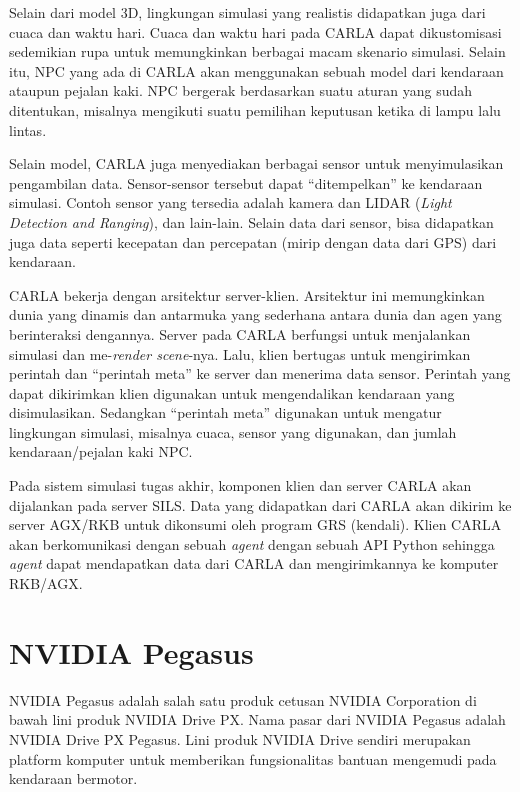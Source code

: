 Selain dari model 3D, lingkungan simulasi yang realistis didapatkan juga dari
cuaca dan waktu hari. Cuaca dan waktu hari pada CARLA dapat dikustomisasi
se\-de\-mi\-ki\-an rupa untuk memungkinkan berbagai macam skenario simulasi.
Selain itu, NPC yang ada di CARLA akan menggunakan sebuah model dari kendaraan
ataupun pejalan kaki. NPC bergerak berdasarkan suatu aturan yang sudah
ditentukan, misalnya mengikuti suatu pemilihan keputusan ketika di lampu lalu
lintas.

Selain model, CARLA juga menyediakan berbagai sensor untuk menyimulasikan
pengambilan data. Sensor-sensor tersebut dapat ``ditempelkan'' ke kendaraan
simulasi. Contoh sensor yang tersedia adalah kamera dan LIDAR (\textit{Light
	Detection and Ranging}), dan lain-lain. Selain data dari sensor, bisa didapatkan
juga data seperti kecepatan dan percepatan (mirip dengan data dari GPS) dari
kendaraan.

CARLA bekerja dengan arsitektur server-klien. Arsitektur ini memungkinkan dunia
yang dinamis dan antarmuka yang sederhana antara dunia dan agen yang
berinteraksi dengannya. Server pada CARLA berfungsi untuk menjalankan simulasi
dan me-\textit{render scene}-nya. Lalu, klien bertugas untuk mengirimkan
perintah dan ``perintah meta'' ke server dan menerima data sensor. Perintah yang
dapat dikirimkan klien digunakan untuk mengendalikan kendaraan yang
disimulasikan. Sedangkan ``perintah meta'' digunakan untuk mengatur lingkungan
simulasi, misalnya cuaca, sensor yang digunakan, dan jumlah kendaraan/pejalan
kaki NPC.

Pada sistem simulasi tugas akhir, komponen klien dan server CARLA akan
dijalankan pada server SILS. Data yang didapatkan dari CARLA akan dikirim ke
server AGX/RKB untuk dikonsumi oleh program GRS (kendali). Klien CARLA akan
berkomunikasi dengan sebuah \textit{agent} dengan sebuah API Python sehingga
\textit{agent} dapat mendapatkan data dari CARLA dan mengirimkannya ke komputer
RKB/AGX.

\section{NVIDIA Pegasus}

NVIDIA Pegasus adalah salah satu produk cetusan NVIDIA Corporation di bawah lini
produk NVIDIA Drive PX. Nama pasar dari NVIDIA Pegasus adalah N\-VI\-DI\-A Drive
PX Pegasus. Lini produk NVIDIA Drive sendiri merupakan platform komputer untuk
memberikan fungsionalitas bantuan mengemudi pada kendaraan bermotor.

